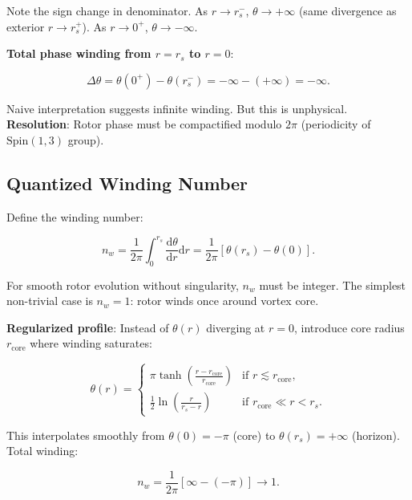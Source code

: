 \documentclass[11pt,a4paper]{article}
\numberwithin{equation}{section}
\theoremstyle{plain}
\theoremstyle{definition}
\theoremstyle{remark}
\newcommand{\Spin}{\mathrm{Spin}}
\renewcommand{\dd}{\mathrm{d}}
\begin{document}
Note the sign change in denominator. As $r \to r_s^-$, $\theta \to +\infty$ (same divergence as exterior $r \to r_s^+$). As $r \to 0^+$, $\theta \to -\infty$.

\textbf{Total phase winding from $r = r_s$ to $r = 0$}:

\begin{equation}
\Delta\theta = \theta(0^+) - \theta(r_s^-) = -\infty - (+\infty) = -\infty.
\end{equation}

Naive interpretation suggests infinite winding. But this is unphysical. \textbf{Resolution}: Rotor phase must be compactified modulo $2\pi$ (periodicity of $\Spin(1,3)$ group).

\subsection{Quantized Winding Number}

Define the winding number:

\begin{equation}
n_w = \frac{1}{2\pi} \int_0^{r_s} \frac{\dd\theta}{\dd r} \dd r = \frac{1}{2\pi}[\theta(r_s) - \theta(0)].
\label{eq:winding-number}
\end{equation}

For smooth rotor evolution without singularity, $n_w$ must be integer. The simplest non-trivial case is $n_w = 1$: rotor winds once around vortex core.

\textbf{Regularized profile}: Instead of $\theta(r)$ diverging at $r=0$, introduce core radius $r_{\text{core}}$ where winding saturates:

\begin{equation}
\theta(r) = \begin{cases}
\pi \tanh\left(\frac{r - r_{\text{core}}}{r_{\text{core}}}\right) & \text{if } r \lesssim r_{\text{core}},\\
\frac{1}{2}\ln\left(\frac{r}{r_s - r}\right) & \text{if } r_{\text{core}} \ll r < r_s.
\end{cases}
\label{eq:theta-regularized}
\end{equation}

This interpolates smoothly from $\theta(0) = -\pi$ (core) to $\theta(r_s) = +\infty$ (horizon). Total winding:

\begin{equation}
n_w = \frac{1}{2\pi}[\infty - (-\pi)] \to 1.
\end{equation}

\end{document}

